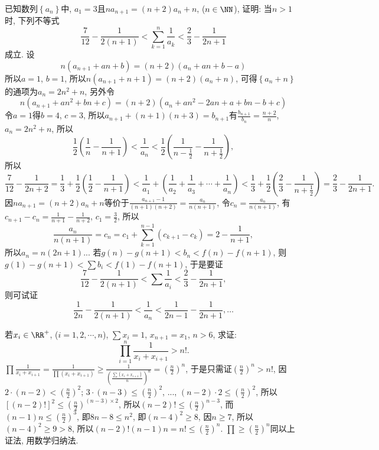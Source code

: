 \bq{}{}
已知数列$\left\{ a_{n}\right\} $中, $a_{1}=3$且$na_{n+1}=\left(n+2\right)a_{n}+n$,
($n\in\NN$), 证明: 当$n>1$时, 下列不等式
\[
\frac{7}{12}-\frac{1}{2\left(n+1\right)}<\sum_{k=1}^{n}\frac{1}{a_{k}}<\frac{2}{3}-\frac{1}{2n+1}
\]
成立.
\eq
\ba
设
\[
n\left(a_{n+1}+an+b\right)=\left(n+2\right)\left(a_{n}+an+b-a\right)
\]
所以$a=1$, $b=1$, 所以$n\left(a_{n+1}+n+1\right)=\left(n+2\right)\left(a_{n}+n\right)$,
可得$\left\{ a_{n}+n\right\} $的通项为$a_{n}=2n^{2}+n$, 另外令
\[
n\left(a_{n+1}+an^{2}+bn+c\right)=\left(n+2\right)\left(a_{n}+an^{2}-2an+a+bn-b+c\right)
\]
令$a=1$得$b=4$, $c=3$, 所以$a_{n+1}+\left(n+1\right)\left(n+3\right)=b_{n+1}$有$\frac{b_{n+1}}{b_{n}}=\frac{n+2}{n}$,
$a_{n}=2n^{2}+n$, 所以
\[
\frac{1}{2}\left(\frac{1}{n}-\frac{1}{n+1}\right)<\frac{1}{a_{n}}<\frac{1}{2}\left(\frac{1}{n-\frac{1}{2}}-\frac{1}{n+\frac{1}{2}}\right),
\]
所以
\[
\frac{7}{12}-\frac{1}{2n+2}=\frac{1}{3}+\frac{1}{2}\left(\frac{1}{2}-\frac{1}{n+1}\right)<\frac{1}{a_{1}}+\left(\frac{1}{a_{2}}+\frac{1}{a_{3}}+\cdots+\frac{1}{a_{n}}\right)<\frac{1}{3}+\frac{1}{2}\left(\frac{2}{3}-\frac{1}{n+\frac{1}{2}}\right)=\frac{2}{3}-\frac{1}{2n+1}.
\]
\ea
\ba
因$na_{n+1}=\left(n+2\right)a_{n}+n$等价于$\frac{a_{n+1}-1}{\left(n+1\right)\left(n+2\right)}=\frac{a_{n}}{n\left(n+1\right)}$,
令$c_{n}=\frac{a_{n}}{n\left(n+1\right)}$, 有$c_{n+1}-c_{n}=\frac{1}{n+1}-\frac{1}{n+2}$,
$c_{1}=\frac{3}{2}$, 所以
\[
\frac{a_{n}}{n\left(n+1\right)}=c_{n}=c_{1}+\sum_{k=1}^{n-1}\left(c_{k+1}-c_{k}\right)=2-\frac{1}{n+1},
\]
所以$a_{n}=n\left(2n+1\right)$...
\ea
\ba
若$g\left(n\right)-g\left(n+1\right)<b_{n}<f\left(n\right)-f\left(n+1\right)$,
则$g\left(1\right)-g\left(n+1\right)<\sum b_{i}<f\left(1\right)-f\left(n+1\right)$,
于是要证
\[
\frac{7}{12}-\frac{1}{2\left(n+1\right)}<\sum\frac{1}{a_{i}}<\frac{2}{3}-\frac{1}{2n+1},
\]
则可试证
\[
\frac{1}{2n}-\frac{1}{2\left(n+1\right)}<\frac{1}{a_{n}}<\frac{1}{2n-1}-\frac{1}{2n+1},\ldots
\]
\ea

\bq{}{}
若$x_{i}\in\RR^{+}$, ($i=1,2,\cdots,n$), $\sum x_{i}=1$, $x_{n+1}=x_{1}$,
$n>6$, 求证:
\[
\prod_{i=1}^{n}\frac{1}{x_{i}+x_{i+1}}>n!.
\]
\eq
\ba
$\prod\frac{1}{x_{i}+x_{i+1}}=\frac{1}{\prod\left(x_{i}+x_{i+1}\right)}\ge\frac{1}{\left(\frac{\sum\left(x_{i}+x_{i+1}\right)}{n}\right)^{n}}=\left(\frac{n}{2}\right)^{n}$,
于是只需证$\left(\frac{n}{2}\right)^{n}>n!$, 因$2\cdot\left(n-2\right)<\left(\frac{n}{2}\right)^{2}$;
$3\cdot\left(n-3\right)\le\left(\frac{n}{2}\right)^{2}$, ..., $\left(n-2\right)\cdot2\le\left(\frac{n}{2}\right)^{2}$,
所以$\left[\left(n-2\right)!\right]^{2}\le\left(\frac{n}{2}\right)^{\left(n-3\right)\times2}$,
所以$\left(n-2\right)!\le\left(\frac{n}{2}\right)^{n-3}$, 而$\left(n-1\right)n\le\left(\frac{n}{2}\right)^{3}$,
即$8n-8\le n^{2}$, 即$\left(n-4\right)^{2}\ge8$, 因$n\ge7$, 所以$\left(n-4\right)^{2}\ge9>8$,
所以$\left(n-2\right)!\left(n-1\right)n=n!\le\left(\frac{n}{2}\right)^{n}$.
\ea
\ba
$\prod\ge\left(\frac{n}{2}\right)^{n}$同以上证法, 用数学归纳法.


